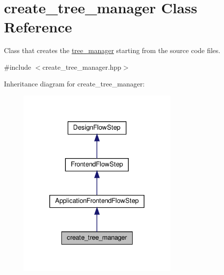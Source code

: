 \hypertarget{classcreate__tree__manager}{}\section{create\+\_\+tree\+\_\+manager Class Reference}
\label{classcreate__tree__manager}


Class that creates the \hyperlink{classtree__manager}{tree\+\_\+manager} starting from the source code files.  




{\ttfamily \#include $<$create\+\_\+tree\+\_\+manager.\+hpp$>$}



Inheritance diagram for create\+\_\+tree\+\_\+manager\+:
\nopagebreak
\begin{figure}[H]
\begin{center}
\leavevmode
\includegraphics[width=224pt]{d2/d18/classcreate__tree__manager__inherit__graph}
\end{center}
\end{figure}


